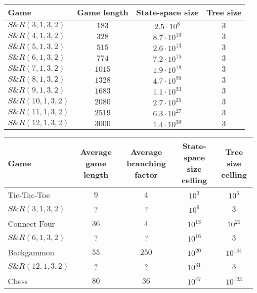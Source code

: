 \documentclass[conference]{IEEEtran}
\newcommand{\sr}{S\&{}R}
\begin{document}
\begin{center}
  \begin{tabular}{ | l || c | c | c | }
    \hline
    Game & Game length & State-space size & Tree size \\ \hline \hline
    $\sr(3,1,3,2)$ & $183$ & $2.5\cdot10^{8}$ & $3$ \\ \hline
    $\sr(4,1,3,2)$ & $328$ & $8.7\cdot10^{10}$ & $3$ \\ \hline
    $\sr(5,1,3,2)$ & $515$ & $2.6\cdot10^{13}$ & $3$ \\ \hline
    $\sr(6,1,3,2)$ & $774$ & $7.2\cdot10^{15}$ & $3$ \\ \hline
    $\sr(7,1,3,2)$ & $1015$ & $1.9\cdot10^{18}$ & $3$ \\ \hline
    $\sr(8,1,3,2)$ & $1328$ & $4.7\cdot10^{20}$ & $3$ \\ \hline
    $\sr(9,1,3,2)$ & $1683$ & $1.1\cdot10^{23}$ & $3$ \\ \hline
    $\sr(10,1,3,2)$ & $2080$ & $2.7\cdot10^{25}$ & $3$ \\ \hline
    $\sr(11,1,3,2)$ & $2519$ & $6.3\cdot10^{27}$ & $3$ \\ \hline
    $\sr(12,1,3,2)$ & $3000$ & $1.4\cdot10^{30}$ & $3$ \\ \hline
  \end{tabular}
\end{center}

\begin{center}
  \begin{tabular}{ | l || c | c | c | c | }
    \hline
    Game & Average game length & Average branching factor & State-space size celling & Tree size celling \\ \hline \hline
    Tic-Tac-Toe & $9$ & $4$ & $10^{3}$ & $10^{5}$ \\ \hline
    $\sr(3,1,3,2)$ & ? & ? & $10^{9}$ & $3$ \\ \hline
    Connect Four & $36$ & $4$ & $10^{13}$ & $10^{21}$ \\ \hline
    $\sr(6,1,3,2)$ & ? & ? & $10^{16}$ & $3$ \\ \hline
    Backgammon & $55$ & $250$  & $10^{20}$ & $10^{144}$ \\ \hline
    $\sr(12,1,3,2)$ & ? & ? & $10^{31}$ & $3$ \\ \hline
    Chess & $80$ & $36$ & $10^{47}$ & $10^{123}$ \\ \hline
    
  \end{tabular}
\end{center}
\end{document}
